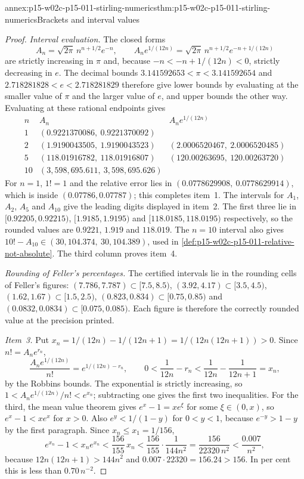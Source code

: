 \begin{annexitem}{annex:p15-w02c-p15-011-stirling-numerics}{thm:p15-w02c-p15-011-stirling-numerics}{Brackets and interval values}
\begin{proof}
\emph{Interval evaluation.} The closed forms
\[
 A_n=\sqrt{2\pi}\,n^{n+1/2}e^{-n},\qquad
 A_ne^{1/(12n)}=\sqrt{2\pi}\,n^{n+1/2}e^{-n+1/(12n)}
\]
are strictly increasing in \(\pi\) and, because \(-n<-n+1/(12n)<0\),
strictly decreasing in \(e\). The decimal bounds
\(3.141592653<\pi<3.141592654\) and \(2.718281828<e<2.718281829\)
therefore give lower bounds by evaluating at the smaller value of \(\pi\)
and the larger value of \(e\), and upper bounds the other way. Evaluating at
these rational endpoints gives
\[
 \begin{array}{c|c|c}
  n & A_n & A_ne^{1/(12n)}\\\hline
  1 & (0.9221370086,\ 0.9221370092) & \\
  2 & (1.9190043505,\ 1.9190043523) & (2.0006520467,\ 2.0006520485)\\
  5 & (118.01916782,\ 118.01916807) & (120.00263695,\ 120.00263720)\\
  10 & (3{,}598{,}695.611,\ 3{,}598{,}695.626) &
 \end{array}
\]
For \(n=1\), \(1!=1\) and the relative error lies in
\((0.0778629908,\ 0.0778629914)\), which is inside \((0.07786,0.07787)\);
this completes item~1. The intervals for \(A_1\), \(A_2\), \(A_5\) and
\(A_{10}\) give the leading digits displayed in item~2. The first three
lie in
\([0.92205,0.92215)\), \([1.9185,1.9195)\) and \([118.0185,118.0195)\)
respectively, so the rounded values are \(0.9221\), \(1.919\) and
\(118.019\). The \(n=10\) interval also gives
\(10!-A_{10}\in(30{,}104.374,\ 30{,}104.389)\), used in
\cref{def:p15-w02c-p15-011-relative-not-absolute}. The third column
proves item~4.

\emph{Rounding of Feller's percentages.} The certified intervals lie in the
rounding cells of Feller's figures: \((7.786,7.787)\subset[7.5,8.5)\),
\((3.92,4.17)\subset[3.5,4.5)\), \((1.62,1.67)\subset[1.5,2.5)\),
\((0.823,0.834)\subset[0.75,0.85)\) and
\((0.0832,0.0834)\subset[0.075,0.085)\). Each figure is therefore the
correctly rounded value at the precision printed.

\emph{Item~3.} Put \(x_n=1/(12n)-1/(12n+1)=1/(12n(12n+1))>0\). Since
\(n!=A_ne^{r_n}\),
\[
 \frac{A_ne^{1/(12n)}}{n!}=e^{1/(12n)-r_n},
 \qquad 0<\frac1{12n}-r_n<\frac1{12n}-\frac1{12n+1}=x_n,
\]
by the Robbins bounds. The exponential is strictly increasing, so
\(1<A_ne^{1/(12n)}/n!<e^{x_n}\); subtracting one gives the first two
inequalities. For the third, the mean value theorem gives
\(e^{x}-1=xe^{\xi}\) for some \(\xi\in(0,x)\), so \(e^x-1<xe^x\) for
\(x>0\). Also \(e^y<1/(1-y)\) for \(0<y<1\), because
\(e^{-y}>1-y\) by the first paragraph. Since \(x_n\leq x_1=1/156\),
\[
 e^{x_n}-1<x_ne^{x_n}<\frac{156}{155}\,x_n
   <\frac{156}{155}\cdot\frac1{144n^2}
   =\frac{156}{22320\,n^2}<\frac{0.007}{n^2},
\]
because \(12n(12n+1)>144n^2\) and \(0.007\cdot22320=156.24>156\).
In per cent this is less than \(0.70\,n^{-2}\).


\end{proof}
\end{annexitem}
